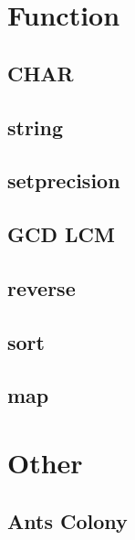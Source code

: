 \section{Function}
        \subsection{CHAR}
                
        \subsection{string}
                
        \subsection{setprecision}
                
        \subsection{GCD LCM}
                
        \subsection{reverse}
                
        \subsection{sort}
                
        \subsection{map}
                

\section{Other}
        \subsection{Ants Colony}
                
